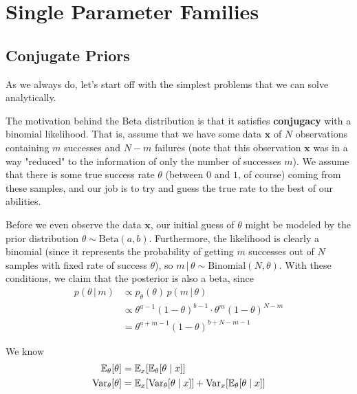 \section{Single Parameter Families} 

\subsection{Conjugate Priors}

  As we always do, let's start off with the simplest problems that we can solve analytically. 

  \begin{example}
    \label{ex:uniform-prior-binomial-likelihood-beta-posterior}
    The motivation behind the Beta distribution is that it satisfies \textbf{conjugacy} with a binomial likelihood. That is, assume that we have some data $\mathbf{x}$ of $N$ observations containing $m$ successes and $N-m$ failures (note that this observation $\mathbf{x}$ was in a way "reduced" to the information of only the number of successes $m$). We assume that there is some true success rate $\theta$ (between $0$ and $1$, of course) coming from these samples, and our job is to try and guess the true rate to the best of our abilities.

    Before we even observe the data $\mathbf{x}$, our initial guess of $\theta$ might be modeled by the prior distribution $\theta \sim \text{Beta}(a, b)$. Furthermore, the likelihood is clearly a binomial (since it represents the probability of getting $m$ successes out of $N$ samples with fixed rate of success $\theta$), so $m\,|\,\theta \sim \text{Binomial}(N, \theta)$. With these conditions, we claim that the posterior is also a beta, since
    \begin{align*}
      p(\theta\,|\, m) & \propto p_\theta (\theta) \, p(m\,|\,\theta) \\
      & \propto \theta^{a - 1} (1 - \theta)^{b - 1} \cdot \theta^m (1 - \theta)^{N - m} \\
      & = \theta^{a + m - 1} (1 - \theta)^{b + N - m - 1}
    \end{align*}
  \end{example}

  \begin{theorem}
    \label{thm:tower-property-for-prior-and-posterior-moments}
    We know 
    \begin{align}
      \mathbb{E}_\theta [\theta] & = \mathbb{E}_x [ \mathbb{E}_{\theta} [\theta \mid x]] \\  
      \operatorname{Var}_\theta [\theta] & = \mathbb{E}_x [ \operatorname{Var}_\theta [\theta \mid x]] + \operatorname{Var}_x [ \mathbb{E}_\theta [\theta \mid x]]
    \end{align}
  \end{theorem}

